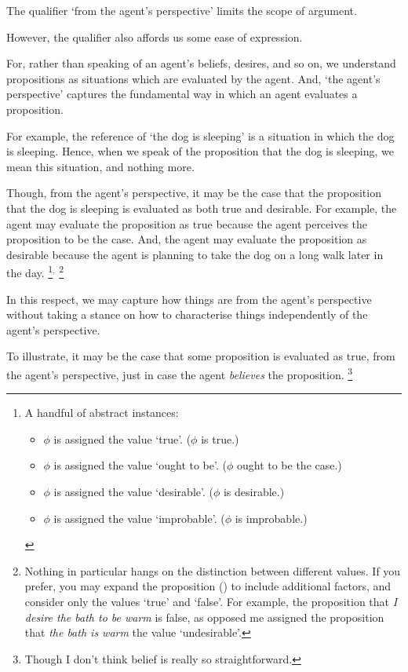 \begin{note}
  The qualifier `from the agent's perspective' limits the scope of argument.

  However, the qualifier also affords us some ease of expression.

  For, rather than speaking of an agent's beliefs, desires, and so on, we understand propositions as situations which are evaluated by the agent.
  And, `the agent's perspective' captures the fundamental way in which an agent evaluates a proposition.

  For example, the reference of `the dog is sleeping' is a situation in which the dog is sleeping.
  Hence, when we speak of the proposition that the dog is sleeping, we mean this situation, and nothing more.

  Though, from the agent's perspective, it may be the case that the proposition that the dog is sleeping is evaluated as both true and desirable.
  For example, the agent may evaluate the proposition as true because the agent perceives the proposition to be the case.
  And, the agent may evaluate the proposition as desirable because the agent is planning to take the dog on a long walk later in the day.%
  \footnote{
    A handful of abstract instances:
    \begin{itemize}[noitemsep]
    \item \(\phi\) is assigned the value `true'. \hfill (\(\phi\) is true.)
    \item \(\phi\) is assigned the value `ought to be'. \hfill (\(\phi\) ought to be the case.)
    \item \(\phi\) is assigned the value `desirable'. \hfill (\(\phi\) is desirable.)
    \item \(\phi\) is assigned the value `improbable'. \hfill (\(\phi\) is improbable.)
    \end{itemize}
  }\(^{,}\)
  \footnote{
    Nothing in particular hangs on the distinction between different values.
    If you prefer, you may expand the proposition (\world{}) to include additional factors, and consider only the values `true' and `false'.
    For example, the proposition that \emph{I desire the bath to be warm} is false, as opposed me assigned the proposition that \emph{the bath is warm} the value `undesirable'.
  }

  In this respect, we may capture how things are from the agent's perspective without taking a stance on how to characterise things independently of the agent's perspective.

  To illustrate, it may be the case that some proposition is evaluated as true, from the agent's perspective, just in case the agent \emph{believes} the proposition.%
  \footnote{
    \label{fn:belief-is-difficult}
    Though I don't think belief is really so straightforward.

}
\end{note}

